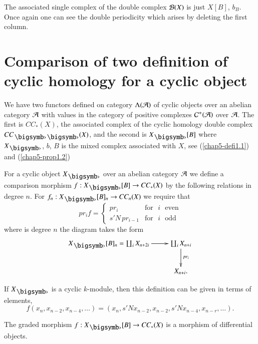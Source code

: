 The associated single complex of the double complex $\mathcal{B}(X)$ is just
$X[B]$, $b_{B}$. Once again one can see the double periodicity which
arises by deleting the first column.

\section[Comparison of two definition of cyclic
  homology...]{Comparison of two definition of cyclic homology for a
  cyclic 
  object}\label{chap5-sec3}\pageoriginale 

We have two functors defined on category $\Lambda(\mathcal{A})$ of cyclic
objects over an abelian category $\mathcal{A}$ with values in the category of
positive complexes $\mathcal{C}^{+}(\mathcal{A})$ over $\mathcal{A}$. The first is
$CC_{\ast}(X)$, the associated complex of the cyclic homology double
complex $CC_{\bigdot\bigdot}(X)$, and the second is $X_{\bigdot}[B]$
where $X_{\bigdot}$, $b$, $B$ is the mixed complex associated with
$X$, see (\ref{chap5-defi1.1}) and (\ref{chap5-prop1.2})

\begin{notation}\label{chap5-not3.1}
For a cyclic object $X_{\bigdot}$ over an abelian category $\mathcal{A}$ we
define a comparison morphism $f:X_{\bigdot}[B]\to CC_{\ast}(X)$ by the
following relations in degree $n$. For $f_{n}:X_{\bigdot}[B]_{n}\to
CC_{n}(X)$ we require that
$$
pr_{i}f=
\begin{cases}
pr_{i} & \text{for~ } i\text{~ even}\\
s'N\,pr_{i-1} & \text{for~ } i\text{~ odd}
\end{cases}
$$
where is degree $n$ the diagram takes the form
\[
\xymatrix{
X_{\bigdot}[B]_{n}=\coprod_{i}X_{n+2i}\ar[r] &
\coprod_{i}X_{n+i}\ar[d]^{pr_{i}}\\ 
& X_{n+i}. 
}
\]

If $X_{\bigdot}$ is a cyclic $k$-module, then this definition can be
given in terms of elements,
$$
f(x_{n},x_{n-2},x_{n-4},\ldots)=(x_{n},s'Nx_{n-2},x_{n-2},s'Nx_{n-4},x_{n-r},\ldots).
$$
\end{notation}

\begin{lemma}\label{chap5-lem3.2}
The graded morphism $f:X_{\bigdot}[B]\to CC_{\ast}(X)$ is a morphism
of differential objects.
\end{lemma}

